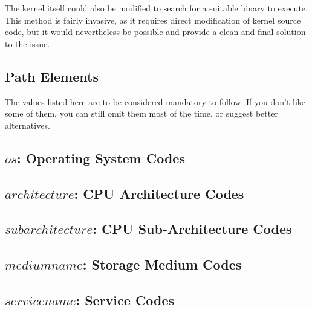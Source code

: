 \documentclass[a4paper,twoside,titlepage]{article}
\begin{document}
The kernel itself could also be modified to search for a suitable binary to
execute. This method is fairly invasive, as it requires direct modification of
kernel source code, but it would nevertheless be possible and provide a clean and
final solution to the issue.

\newpage

\begin{appendix}
\section{Path Elements}
The values listed here are to be considered mandatory to follow. If you don't
like some of them, you can still omit them most of the time, or suggest better
alternatives.

\subsection{$os$: Operating System Codes}

\subsection{$architecture$: CPU Architecture Codes}

\subsection{$subarchitecture$: CPU Sub-Architecture Codes}

\subsection{$mediumname$: Storage Medium Codes}

\subsection{$servicename$: Service Codes}

\end{appendix}

\newpage

\begin{thebibliography}{alpha}

\end{thebibliography}
\end{document}
